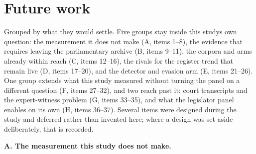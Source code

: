 \section{Future work}\label{app:future}

Grouped by what they would settle. Five groups stay inside this study\textquotesingle s own
question: the measurement it does not make (A, items 1--8), the evidence that
requires leaving the parliamentary archive (B, items 9--11), the corpora and
arms already within reach (C, items 12--16), the rivals for the register trend
that remain live (D, items 17--20), and the detector and evasion arm (E, items
21--26). One group extends what this study measured without turning the panel
on a different question (F, items 27--32), and two reach past it: court
transcripts and the expert-witness problem (G, items 33--35), and what the
legislator panel enables on its own (H, items 36--37). Several items were designed during the study
and deferred rather than invented here; where a design was set aside
deliberately, that is recorded.

\textbf{A. The measurement this study does not make.}

